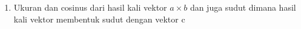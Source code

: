 \documentclass[12pt,titlepage]{article}
\begin{document}
\begin{enumerate}
{\begin{enumerate}
{                \begin{align*}
                    cos\theta &= \frac{5}{3\sqrt{5}} . \frac{4}{5\sqrt{2}} + \frac{4}{3\sqrt{5}} . \frac{-5}{5\sqrt{2}} + \frac{2}{3\sqrt{5}} . \frac{3}{5\sqrt{2}} \\
                    &= \frac{20}{15\sqrt{10}} + \frac{-20}{15\sqrt{10}} + \frac{6}{15\sqrt{10}} \\
                    &= \frac{20 - 20 + 6}{15\sqrt{10}} \\
                    &= \frac{6}{15\sqrt{10}} \\
                    &= \frac{2}{5\sqrt{10}} \\
                    &= \frac{2}{5\sqrt{10}} \times \frac{\sqrt{10}}{\sqrt{10}} \\
                    &= \frac{2\sqrt{10}}{50} \\
                    &= \frac{\sqrt{10}}{25} \\
                    \\
                    \theta &= cos^{-1}(\frac{\sqrt{10}}{25}) \\
                    &= cos^{-1}(0.1265) \\
                    &= 82.76^{\circ} \\
                \end{align*}
            }
            \pagebreak
            \item {
                Ukuran dan cosinus dari hasil kali vektor $a \times b$ dan juga sudut dimana hasil kali vektor membentuk sudut dengan vektor c
    
}
\end{enumerate}}
\end{enumerate}
\end{document}
